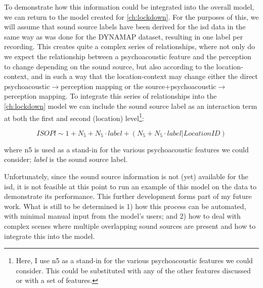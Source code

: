 To demonstrate how this information could be integrated into the overall model, we can return to the model created for \cref{ch:lockdown}. For the purposes of this, we will assume that sound source labels have been derived for the \gls{isd} data in the same way as was done for the DYNAMAP dataset, resulting in one label per recording. This creates quite a complex series of relationships, where not only do we expect the relationship between a psychoacoustic feature and the perception to change depending on the sound source, but also according to the location-context, and in such a way that the location-context may change either the direct psychoacoustic$\rightarrow$perception mapping or the source+psychoacoustic$\rightarrow$perception mapping. To integrate this series of relationships into the \cref{ch:lockdown} model we can include the sound source label as an interaction term at both the first and second (location) level\footnote{Here, I use \gls{n5} as a stand-in for the various psychoacoustic features we could consider. This could be substituted with any of the other features discussed or with a set of features.}:

\begin{equation}
  \label{eqn:integSource}
      ISOPl \sim 1 + N_5 + N_5 \cdot label + (N_5 + N_5 \cdot label | LocationID)
  \end{equation}

where \gls{n5} is used as a stand-in for the various psychoacoustic features we could consider; \emph{label} is the sound source label.



Unfortunately, since the sound source information is not (yet) available for the \gls{isd}, it is not feasible at this point to run an example of this model on the data to demonstrate its performance. This further development forms part of my future work.  What is still to be determined is 1) how this process can be automated, with minimal manual input from the model's users; and 2) how to deal with complex scenes where multiple overlapping sound sources are present and how to integrate this into the model.

